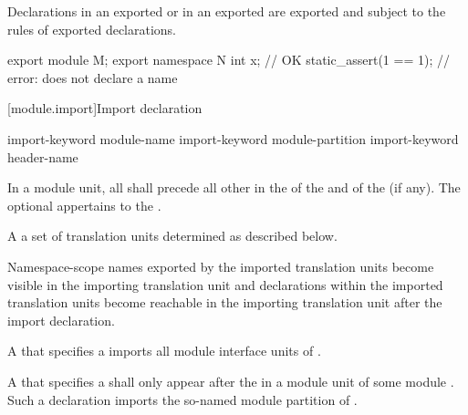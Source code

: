 \pnum
\begin{note}
Declarations in an exported 
or in an exported 
are exported and subject to the rules of exported declarations.
\begin{example}
\begin{codeblock}
export module M;
export namespace N {
  int x;                        // OK
  static_assert(1 == 1);        // error: does not declare a name
}
\end{codeblock}
\end{example}
\end{note}

[module.import]{Import declaration}%

\begin{bnf}
\br
     import-keyword module-name  \terminal{;}\br
     import-keyword module-partition  \terminal{;}\br
     import-keyword header-name  \terminal{;}
\end{bnf}

\pnum
In a module unit, all 
shall precede all other  in
the  of the
and of the  (if any).
The optional 
appertains to the .

\pnum
A   a set of
translation units determined as described below.
\begin{note}
Namespace-scope names exported by the imported translation units
become visible
in the importing translation unit
and declarations within the imported translation units
become reachable
in the importing translation unit
after the import declaration.
\end{note}

\pnum
A  that specifies
a  
imports all module interface units of .

\pnum
A  that specifies
a  shall only appear after
the  in a module unit of
some module .
Such a declaration imports the so-named
module partition of .

